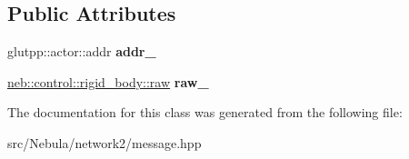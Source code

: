 \subsection*{\-Public \-Attributes}
\begin{DoxyCompactItemize}
\item 
\hypertarget{classneb_1_1network_1_1control_1_1rigid__body_1_1create_aaf71d5277fad8265987d2d32d10b9229}{glutpp\-::actor\-::addr {\bfseries addr\-\_\-}}\label{classneb_1_1network_1_1control_1_1rigid__body_1_1create_aaf71d5277fad8265987d2d32d10b9229}

\item 
\hypertarget{classneb_1_1network_1_1control_1_1rigid__body_1_1create_ae1c1d817bc0ca602855b4fec2b47472b}{\hyperlink{classneb_1_1control_1_1rigid__body_1_1raw}{neb\-::control\-::rigid\-\_\-body\-::raw} {\bfseries raw\-\_\-}}\label{classneb_1_1network_1_1control_1_1rigid__body_1_1create_ae1c1d817bc0ca602855b4fec2b47472b}

\end{DoxyCompactItemize}


\-The documentation for this class was generated from the following file\-:\begin{DoxyCompactItemize}
\item 
src/\-Nebula/network2/message.\-hpp\end{DoxyCompactItemize}

